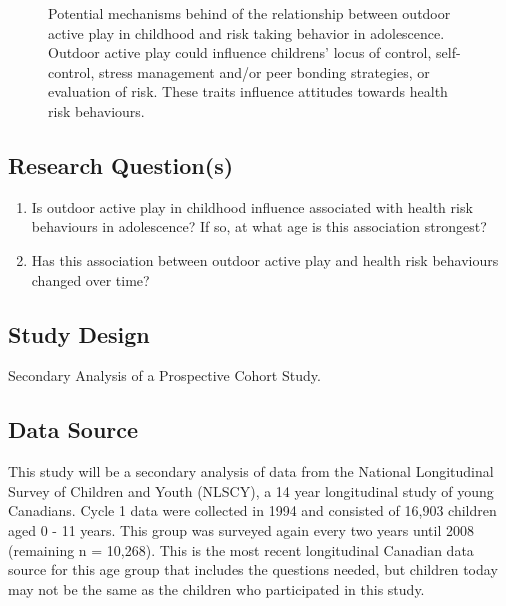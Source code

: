 \documentclass [11pt]{article}
\begin{document}
\begin{figure}[h]
\caption{Potential mechanisms behind of the relationship between outdoor active play in childhood and risk taking behavior in adolescence. Outdoor active play could influence childrens' locus of control, self-control, stress management and/or peer bonding strategies, or evaluation of risk. These traits influence attitudes towards health risk behaviours.}
\label{overall}
\end{figure}




\subsection{Research Question(s)} 
\begin{enumerate}
\item Is outdoor active play in childhood influence associated with health risk behaviours in adolescence? If so, at what age is this association strongest? 
\item Has this association between outdoor active play and health risk behaviours changed over time? 
\end{enumerate}

\subsection{Study Design} Secondary Analysis of a Prospective Cohort Study. 

\subsection{Data Source} This study will be a secondary analysis of data from the National Longitudinal Survey of Children and Youth (NLSCY), a 14 year longitudinal study of young Canadians. Cycle 1 data were collected in 1994 and consisted of 16,903 children aged 0 - 11 years. This group was surveyed again every two years until 2008 (remaining n = 10,268). This is the most recent longitudinal Canadian data source for this age group that includes the questions needed, but children today may not be the same as the children who participated in this study. 
\end{document}
